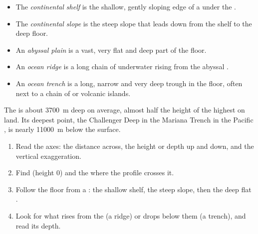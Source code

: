 \begin{definition}\label{def:g8:the-oceans:seafloor}
\begin{itemize}
  \item The \emph{continental shelf} is the
        shallow, gently sloping edge of a  under the .
  \item The \emph{continental slope} is the
        steep slope that leads down from the shelf to the deep  floor.
  \item An \emph{abyssal plain} is a vast, very flat
        and deep part of the  floor.
  \item An \emph{ocean ridge} is a long chain of
        underwater  rising from the abyssal .
  \item An \emph{ocean trench} is a long, narrow and
        very deep trough in the  floor, often next to a chain of
         or volcanic islands.
\end{itemize}
\end{definition}

The  is about \qty{3700}{m} deep on average, almost half the height
of the highest  on land. Its deepest point, the Challenger Deep in
the Mariana Trench in the Pacific , is nearly \qty{11000}{m} below
the surface.


\begin{method}
\begin{enumerate}
  \item Read the axes: the distance across, the height or depth up and
        down, and the vertical exaggeration.
  \item Find  (height 0) and the  where the profile crosses
        it.
  \item Follow the floor from a : the shallow shelf, the steep slope,
        then the deep flat .
  \item Look for what rises from the  (a ridge) or drops below them
        (a trench), and read its depth.
\end{enumerate}
\end{method}

